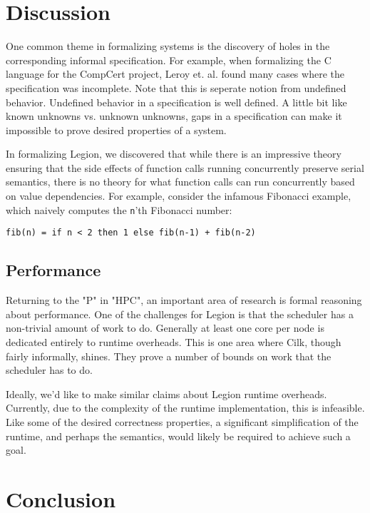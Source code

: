 \documentclass[sigplan]{acmart}
\begin{document}
\section{Discussion}

One common theme in formalizing systems is the discovery of holes in the
corresponding informal specification. For example, when formalizing the C
language for the CompCert project, Leroy et. al. found many cases where the
specification was incomplete. Note that this is seperate notion from undefined
behavior. Undefined behavior in a specification is well defined. A little bit
like known unknowns vs. unknown unknowns, gaps in a specification can make it
impossible to prove desired properties of a system.  

In formalizing Legion, we discovered that while there is an impressive theory
ensuring that the side effects of function calls running concurrently preserve
serial semantics, there is no theory for what function calls can run
concurrently based on value dependencies. For example, consider the infamous
Fibonacci example, which naively computes the \texttt{n}'th Fibonacci number: 

\begin{lstlisting}
fib(n) = if n < 2 then 1 else fib(n-1) + fib(n-2)
\end{lstlisting}

\subsection{Performance}

Returning to the "P" in "HPC", an important area of research is formal
reasoning about performance. One of the challenges for Legion is that the
scheduler has a non-trivial amount of work to do. Generally at least one core
per node is dedicated entirely to runtime overheads. This is one area where
Cilk, though fairly informally, shines. They prove a number of bounds on work
that the scheduler has to do.  

Ideally, we'd like to make similar claims about Legion runtime overheads.
Currently, due to the complexity of the runtime implementation, this is
infeasible. Like some of the desired correctness properties, a significant
simplification of the runtime, and perhaps the semantics, would likely be
required to achieve such a goal.

\section{Conclusion}
\end{document}
